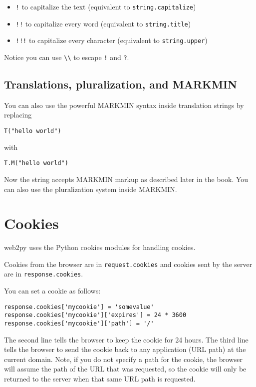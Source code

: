 \documentclass[justified,sixbynine,notoc]{tufte-book}
\def\ft{\small\tt}
\def\inxx#1{\index{#1}}
\begin{document}
\begin{fullwidth}
\begin{itemize}
\item {\ft !} to capitalize the text (equivalent to {\ft string.capitalize})

\item {\ft !!} to capitalize every word (equivalent to {\ft string.title})

\item {\ft !!!} to capitalize every character (equivalent to {\ft string.upper})
\end{itemize}

Notice you can use {\ft {\textbackslash}{\textbackslash}} to escape {\ft !} and {\ft ?}.

\goodbreak\subsection{Translations, pluralization, and MARKMIN}

You can also use the powerful MARKMIN syntax inside translation strings by replacing

\begin{lstlisting}
T("hello world")
\end{lstlisting}
\noindent with

\begin{lstlisting}
T.M("hello world")
\end{lstlisting}

Now the string accepts MARKMIN markup as described later in the book. You can also use the pluralization system inside MARKMIN.

\goodbreak\section{Cookies}

\inxx{cookies}
\noindent web2py uses the Python cookies modules for handling cookies.

Cookies from the browser are in {\ft request.cookies} and cookies sent by the server are in {\ft response.cookies}.

You can set a cookie as follows:
\begin{lstlisting}
response.cookies['mycookie'] = 'somevalue'
response.cookies['mycookie']['expires'] = 24 * 3600
response.cookies['mycookie']['path'] = '/'
\end{lstlisting}

The second line tells the browser to keep the cookie for 24 hours. The third line tells the browser to send the cookie back to any application (URL path) at the current domain. Note, if you do not specify a path for the cookie, the browser will assume the path of the URL that was requested, so the cookie will only be returned to the server when that same URL path is requested.


\end{fullwidth}
\end{document}
